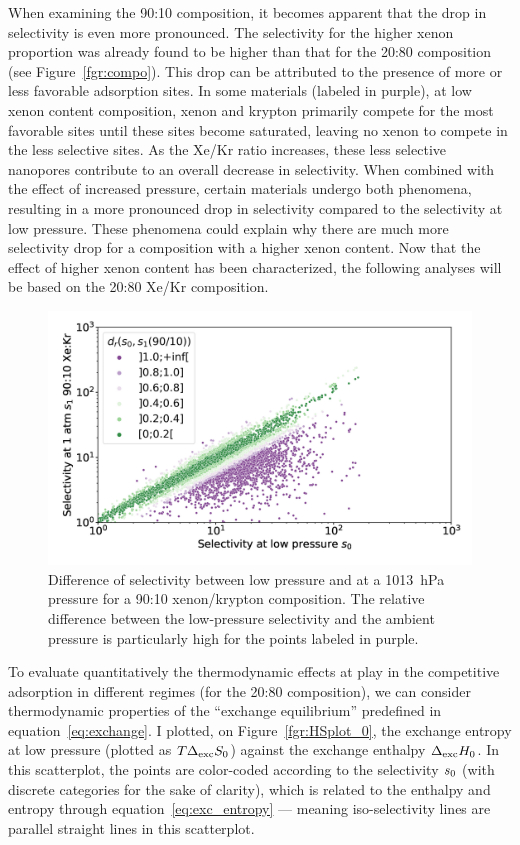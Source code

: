 \documentclass[main.tex]{subfiles}
\begin{document}
When examining the 90:10 composition, it becomes apparent that the drop in selectivity is even more pronounced. The selectivity for the higher xenon proportion was already found to be higher than that for the 20:80 composition (see Figure~\ref{fgr:compo}). This drop can be attributed to the presence of more or less favorable adsorption sites. In some materials (labeled in purple), at low xenon content composition, xenon and krypton primarily compete for the most favorable sites until these sites become saturated, leaving no xenon to compete in the less selective sites. As the Xe/Kr ratio increases, these less selective nanopores contribute to an overall decrease in selectivity. When combined with the effect of increased pressure, certain materials undergo both phenomena, resulting in a more pronounced drop in selectivity compared to the selectivity at low pressure. These phenomena could explain why there are much more selectivity drop for a composition with a higher xenon content. Now that the effect of higher xenon content has been characterized, the following analyses will be based on the 20:80 Xe/Kr composition.

\begin{figure}[t]
  \centering
    \includegraphics[width=0.6\linewidth]{figures/2-thermo/s_0_vs_s_9010_overview_log.jpg}
    \caption{Difference of selectivity between low pressure and at a \SI{1013}{\hecto\pascal} pressure for a 90:10 xenon/krypton composition. The relative difference between the low-pressure selectivity and the ambient pressure is particularly high for the points labeled in purple.}\label{fgr:overview_9010}
\end{figure}
  
To evaluate quantitatively the thermodynamic effects at play in the competitive adsorption in different regimes (for the 20:80 composition), we can consider thermodynamic properties of the ``exchange equilibrium'' predefined in equation~\ref{eq:exchange}. I plotted, on Figure~\ref{fgr:HSplot_0}, the exchange entropy at low pressure (plotted as $T\Delta_{\text{exc}}S_{\text{0}}$) against the exchange enthalpy $\Delta_{\text{exc}}H_{\text{0}}$. In this scatterplot, the points are color-coded according to the selectivity $s_{\text{0}}$ (with discrete categories for the sake of clarity), which is related to the enthalpy and entropy through equation~\ref{eq:exc_entropy} --- meaning iso-selectivity lines are parallel straight lines in this scatterplot.
  
\end{document}
